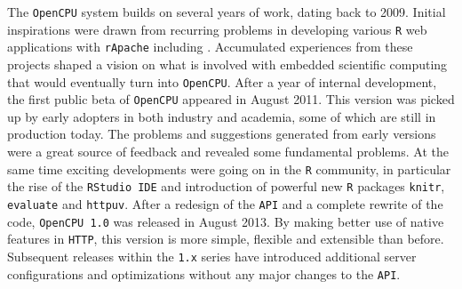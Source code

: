 \documentclass{article}
\newcommand{\R}{\texttt{R}\xspace}
\newcommand{\HTTP}{\texttt{HTTP}\xspace}
\newcommand{\API}{\texttt{API}\xspace}
\newcommand{\OpenCPU}{\texttt{OpenCPU}\xspace}
\begin{document}

The \OpenCPU system builds on several years of work, dating back to 2009. Initial inspirations were drawn from recurring problems in developing various \R web applications with \texttt{rApache} including \cite{van2009stage}. Accumulated experiences from these projects shaped a vision on what is involved with embedded scientific computing that would eventually turn into \OpenCPU. After a year of internal development, the first public beta of \OpenCPU appeared in August 2011. This version was picked up by early adopters in both industry and academia, some of which are still in production today. The problems and suggestions generated from early versions were a great source of feedback and revealed some fundamental problems. At the same time exciting developments were going on in the \R community, in particular the rise of the \texttt{RStudio IDE} and introduction of powerful new \R packages \texttt{knitr}, \texttt{evaluate} and \texttt{httpuv}. After a redesign of the \API and a complete rewrite of the code, \texttt{OpenCPU 1.0} was released in August 2013. By making better use of native features in \HTTP, this version is more simple, flexible and extensible than before. Subsequent releases within the \texttt{1.x} series have introduced additional server configurations and optimizations without any major changes to the \API.
\end{document}
